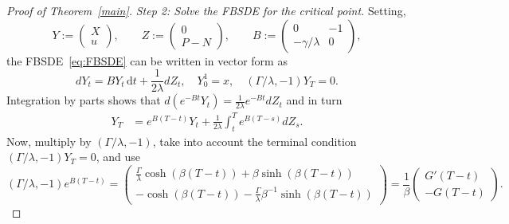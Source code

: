 \documentclass[11pt]{article}
\theoremstyle{definition}
\theoremstyle{remark}
\newcommand{\de}{\,\mathrm{d}}
\begin{document}
\begin{proof}[Proof of Theorem~\ref{main}]
\emph{Step 2: Solve the FBSDE for the critical point.} 
Setting,
\[
 Y:=\begin{pmatrix} X \\ u\end{pmatrix},\qquad Z:=\begin{pmatrix} 0 \\ P-N\end{pmatrix},\qquad B:=\begin{pmatrix} 0 & -1 \\ -\gamma/\lambda & 0\end{pmatrix},
\]
the FBSDE~\eqref{eq:FBSDE} can be written in vector form as 
\[
dY_t = B Y_t \de t + \frac{1}{2\lambda}dZ_t, \quad Y^1_0=x, \quad (\Gamma/\lambda, -1)Y_T = 0.
\]
Integration by parts shows that $d(e^{-B t}Y_t)=\frac{1}{2\lambda}e^{-B t}dZ_t$ and in turn
\begin{align*}
Y_T &= e^{B(T-t)}Y_t+\frac{1}{2\lambda}\int_t^T e^{B(T-s)}dZ_s.%
\end{align*}
Now, multiply by $(\Gamma/\lambda,-1)$, take into account the terminal condition $(\Gamma/\lambda, -1)Y_T = 0$, and use  
$$
(\Gamma/\lambda, -1)e^{B(T-t)}=\begin{pmatrix} \frac{\Gamma}{\lambda}\cosh(\beta (T-t))+\beta \sinh(\beta(T-t)) \\ -\cosh(\beta(T-t))-\frac{\Gamma}{\lambda}\beta^{-1} \sinh(\beta(T-t))\end{pmatrix}=\frac{1}{\beta}\begin{pmatrix} G'(T-t) \\ -G(T-t) \end{pmatrix}.
$$

\end{proof}
\end{document}
